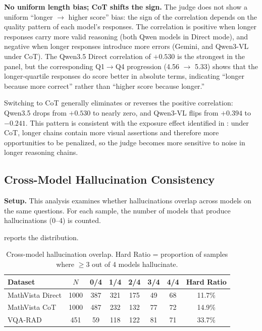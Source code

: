 \textbf{No uniform length bias; CoT shifts the sign.}
The judge does not show a uniform ``longer $\to$ higher score'' bias:
the sign of the correlation depends
on the quality pattern of each model's responses.
The correlation is positive when longer responses
carry more valid reasoning
(both Qwen models in Direct mode),
and negative when longer responses
introduce more errors
(Gemini, and Qwen3-VL under CoT).
The Qwen3.5 Direct correlation of $+0.530$ is the strongest in the panel,
but the corresponding Q1$\to$Q4 progression (4.56 $\to$ 5.33)
shows that the longer-quartile responses
do score better in absolute terms,
indicating ``longer because more correct''
rather than ``higher score because longer.''

Switching to CoT generally eliminates or reverses the positive correlation:
Qwen3.5 drops from $+0.530$ to nearly zero,
and Qwen3-VL flips from $+0.394$ to $-0.241$.
This pattern is consistent
with the exposure effect identified in :
under CoT, longer chains contain more visual assertions
and therefore more opportunities to be penalized,
so the judge becomes more sensitive
to noise in longer reasoning chains.

\subsection{Cross-Model Hallucination Consistency}

\textbf{Setup.}
This analysis examines whether hallucinations overlap across models
on the same questions.
For each sample,
the number of models that produce hallucinations (0--4) is counted.

 reports the distribution.

\begin{table}[htbp]
  \centering
  \caption{Cross-model hallucination overlap.
    Hard Ratio = proportion of samples
    where $\geq$3 out of 4 models hallucinate.}
  \label{tab:cross_model_consistency}
  \begin{tabular}{lc ccccc c}
    \toprule
    Dataset & $N$ & 0/4 & 1/4 & 2/4 & 3/4 & 4/4 & Hard Ratio \\
    \midrule
    MathVista Direct & 1000 & 387 & 321 & 175 & 49 & 68 & 11.7\% \\
    MathVista CoT    & 1000 & 487 & 232 & 132 & 77 & 72 & 14.9\% \\
    VQA-RAD          & 451  & 59  & 118 & 122 & 81 & 71 & 33.7\% \\
    \bottomrule
  \end{tabular}
\end{table}

